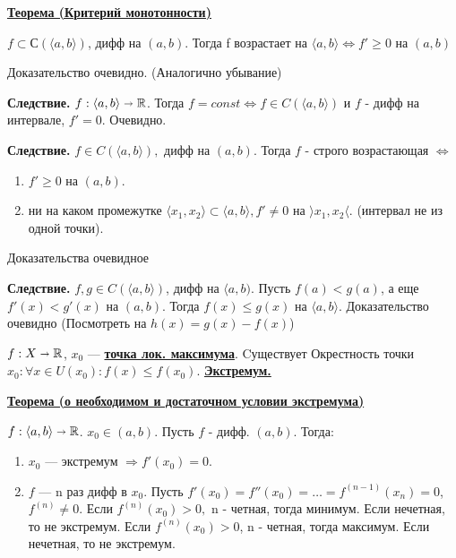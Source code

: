 \documentclass{article}
\newcommand{\deff}[1]{\underline{\textbf{#1}}}
\newcommand{\thmm}[1]{\underline{\textbf{#1}}}
\begin{document}
\thmm{Теорема (Критерий монотонности)}

$f \subset С(\langle a,b\rangle)$, дифф на $(a,b)$. Тогда f возрастает на $\langle a,b\rangle \Leftrightarrow f' \geq 0$ на $(a,b)$

Доказательство очевидно. (Аналогично убывание)

\textbf{Следствие.} $f: \langle a,b\rangle \shortrightarrow \mathbb{R}$.  Тогда $f = const \Leftrightarrow f \in C(\langle a,b \rangle)$ и $f$ - дифф на интервале, $f'=0$. Очевидно.

\textbf{Следствие.} $f\in C(\langle a,b \rangle),$ дифф на $(a,b)$. Тогда $f$ - строго возрастающая $\Leftrightarrow$

\begin{enumerate}
    \item $f'\geq 0$ на $(a,b)$.
    \item ни на каком промежутке $\langle x_1,x_2\rangle \subset \langle a,b \rangle, f' \neq 0 $ на $\rangle x_1,x_2 \langle$. (интервал не из одной точки).
\end{enumerate}

Доказательства очевидное

\textbf{Следствие.} $f,g \in C(\langle a,b\rangle)$, дифф на $\langle a,b)$. Пусть $f(a)< g(a)$, а еще $f'(x)<g'(x)$ на $(a,b)$. Тогда $f(x)\leq g(x) $ на $\langle a,b\rangle$. Доказательство очевидно (Посмотреть на $h(x) = g(x)-f(x)$)

$f: X \shortrightarrow \mathbb{R}$, $x_0$ --- \deff{точка лок. максимума}. Cуществует Окрестность точки $x_0: \forall x \in U(x_0): f(x)\leq f(x_0)$. \deff{Экстремум.}

\thmm{Теорема (о необходимом и достаточном условии экстремума)}

$f: \langle a,b \rangle \shortrightarrow \mathbb{R}$. $x_0 \in (a,b)$. Пусть $f$ - дифф. $(a,b)$. Тогда:

\begin{enumerate}
    \item $x_0$ --- экстремум $\Rightarrow f'(x_0) = 0$.
    \item $f$ --- n раз дифф в $x_0$. Пусть $f'(x_0)=f''(x_0)=\ldots =f^{(n-1)}(x_n)=0$, $f^{(n)}\neq 0$. Если $f^{(n)}(x_0)>0,$ n - четная, тогда минимум. Если нечетная, то не экстремум. Если   $f^{(n)}(x_0)>0$, n - четная, тогда максимум. Если нечетная, то не экстремум.
\end{enumerate}
\end{document}
